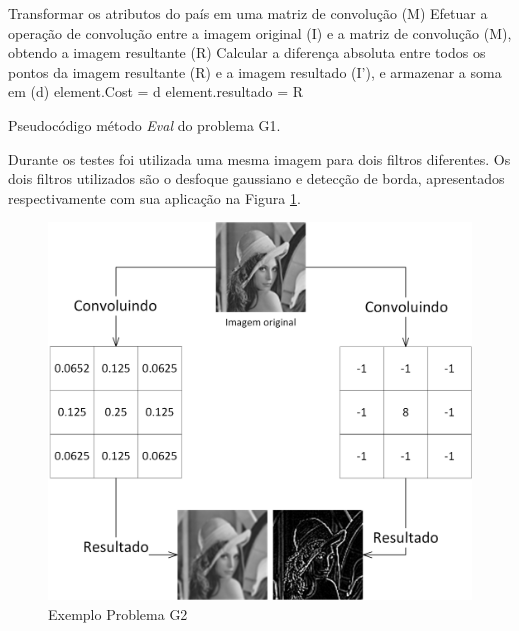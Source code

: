 \begin{algorithm}[h]
\SetAlgoLined
{}
Transformar os atributos do país em uma matriz de convolução (M)\;
Efetuar a operação de convolução entre a imagem original (I) e a matriz de convolução (M), obtendo a imagem resultante (R) \;
Calcular a diferença absoluta entre todos os pontos da imagem resultante (R) e a imagem resultado (I'), e armazenar a soma em (d)\;
element.Cost = d\;
element.resultado = R\;
\caption{ Pseudocódigo método \emph{Eval} do problema G1.}
\label{alg:G2Problem}
\end{algorithm}

Durante os testes foi utilizada uma mesma imagem para dois filtros diferentes. Os dois filtros utilizados são o desfoque gaussiano e detecção de borda, apresentados respectivamente com sua aplicação na Figura \ref{fig:Problems-G2Convolution}.

\begin{figure}[h]
	\centering
	\includegraphics[scale=0.6]{Figuras/Problems-G2Convolution.png}
	\caption{Exemplo Problema G2}
	\label{fig:Problems-G2Convolution}
\end{figure}


